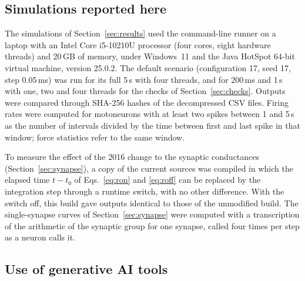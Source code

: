 \documentclass[pdflatex,sn-apa,iicol]{sn-jnl}
\begin{document}
\subsection{Simulations reported here}\label{sec:sims}

The simulations of Section~\ref{sec:results} used the command-line runner on a laptop with an Intel Core i5-10210U processor (four cores, eight hardware threads) and 20\,GB of memory, under Windows~11 and the Java HotSpot 64-bit virtual machine, version 25.0.2. The default scenario (configuration 17, seed 17, step 0.05\,ms) was run for its full 5\,s with four threads, and for 200\,ms and 1\,s with one, two and four threads for the checks of Section~\ref{sec:checks}. Outputs were compared through SHA-256 hashes of the decompressed CSV files. Firing rates were computed for motoneurons with at least two spikes between 1 and 5\,s as the number of intervals divided by the time between first and last spike in that window; force statistics refer to the same window.

To measure the effect of the 2016 change to the synaptic conductances (Section~\ref{sec:synapse}), a copy of the current sources was compiled in which the elapsed time $t - t_0$ of Eqs.~\eqref{eq:ron} and \eqref{eq:roff} can be replaced by the integration step through a runtime switch, with no other difference. With the switch off, this build gave outputs identical to those of the unmodified build.
The single-synapse curves of Section~\ref{sec:synapse} were computed with a transcription of the arithmetic of the synaptic group for one synapse, called four times per step as a neuron calls it.

\subsection{Use of generative AI tools}\label{sec:ai}
\end{document}
